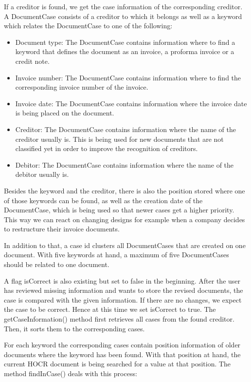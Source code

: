 If a creditor is found, we get the case information of the corresponding creditor. A DocumentCase consists of a creditor to which it belongs as well as a keyword which relates the DocumentCase to one of the following:
\begin{itemize}
	\item Document type: The DocumentCase contains information where to find a keyword that defines the document as an invoice, a proforma invoice or a credit note.
	\item Invoice number: The DocumentCase contains information where to find the corresponding invoice number of the invoice.
	\item Invoice date: The DocumentCase contains information where the invoice date is being placed on the document.
	\item Creditor: The DocumentCase contains information where the name of the creditor usually is. This is being used for new documents that are not classified yet in order to improve the recognition of creditors.
	\item Debitor: The DocumentCase contains information where the name of the debitor usually is.
\end{itemize}

Besides the keyword and the creditor, there is also the position stored where one of those keywords can be found, as well as the creation date of the DocumentCase, which is being used so that newer cases get a higher priority. This way we can react on changing designs for example when a company decides to restructure their invoice documents.

In addition to that, a case id clusters all DocumentCases that are created on one document. With five keywords at hand, a maximum of five DocumentCases should be related to one document.

A flag isCorrect is also existing but set to false in the beginning. After the user has reviewed missing information and wants to store the revised documents, the case is compared with the given information. If there are no changes, we expect the case to be correct. Hence at this time we set isCorrect to true.
The getCaseInformation() method first retrieves all cases from the found creditor. Then, it sorts them to the corresponding cases.

For each keyword the corresponding cases contain position information of older documents where the keyword has been found. With that position at hand, the current HOCR document is being searched for a value at that position. The method findInCase() deals with this process:

